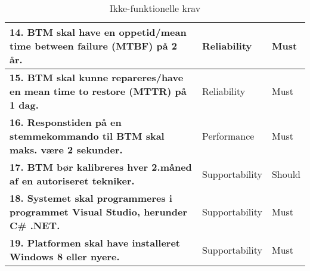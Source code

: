 \begin{table} [htbp]
\begin{tabular}{|p{10cm}|l|l|}
\textbf{14. BTM skal have en oppetid/mean time between failure (MTBF) på  2 år. } & Reliability & Must \\ \hline
\textbf{15. BTM skal kunne repareres/have en mean time to restore (MTTR) på 1 dag. } & Reliability & Must \\ \hline
\textbf{16. Responstiden på en stemmekommando til BTM skal maks. være 2 sekunder.} & Performance & Must \\ \hline
\textbf{17. BTM bør kalibreres hver 2.måned af en autoriseret tekniker. } & Supportability & Should \\ \hline
\textbf{18. Systemet skal programmeres i programmet Visual Studio, herunder C\# .NET.} & Supportability & Must \\ \hline
\textbf{19. Platformen skal have installeret Windows 8 eller nyere.} & Supportability & Must \\ \hline

\end{tabular}
\caption{Ikke-funktionelle krav}
\label{tb:ikkefunkkrav} 
\end{table}
